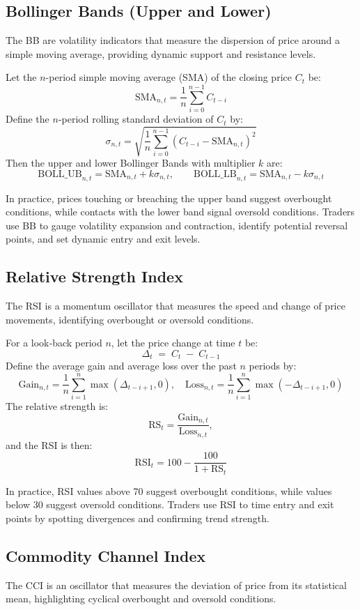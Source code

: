 \subsection{Bollinger Bands (Upper and Lower)}
The \gls{BB} are volatility indicators that measure the dispersion of price around a simple moving average, providing dynamic support and resistance levels.

Let the \(n\)-period simple moving average (SMA) of the closing price \(C_t\) be:
\[\mathrm{SMA}_{n,t} = \frac{1}{n} \sum_{i=0}^{n-1} C_{t-i}\]
Define the \(n\)-period rolling standard deviation of \(C_t\) by:
\[\sigma_{n,t} = \sqrt{\frac{1}{n} \sum_{i=0}^{n-1} (C_{t-i} - \mathrm{SMA}_{n,t})^2}\]
Then the upper and lower Bollinger Bands with multiplier \(k\) are:
\[\mathrm{BOLL\_UB}_{n,t} = \mathrm{SMA}_{n,t} + k \sigma_{n,t}, \qquad \mathrm{BOLL\_LB}_{n,t} = \mathrm{SMA}_{n,t} - k \sigma_{n,t}\]

In practice, prices touching or breaching the upper band suggest overbought conditions, while contacts with the lower band signal oversold conditions. Traders use \gls{BB} to gauge volatility expansion and contraction, identify potential reversal points, and set dynamic entry and exit levels.

\subsection{Relative Strength Index}
The \gls{RSI} is a momentum oscillator that measures the speed and change of price movements, identifying overbought or oversold conditions.

For a look‐back period \(n\), let the price change at time \(t\) be:
\[\Delta_t \;=\; C_t \;-\; C_{t-1}\]
Define the average gain and average loss over the past \(n\) periods by:
\[\mathrm{Gain}_{n,t} = \frac{1}{n} \sum_{i=1}^{n} \max(\Delta_{t-i+1},0), \quad \mathrm{Loss}_{n,t} = \frac{1}{n} \sum_{i=1}^{n} \max(-\Delta_{t-i+1},0)\]
The relative strength is:
\[\mathrm{RS}_t = \frac{\mathrm{Gain}_{n,t}}{\mathrm{Loss}_{n,t}},\]
and the RSI is then:
\[\mathrm{RSI}_t = 100 - \frac{100}{1 + \mathrm{RS}_t}\]

In practice, \gls{RSI} values above 70 suggest overbought conditions, while values below 30 suggest oversold conditions. Traders use \gls{RSI} to time entry and exit points by spotting divergences and confirming trend strength.

\subsection{Commodity Channel Index}
The \gls{CCI} is an oscillator that measures the deviation of price from its statistical mean, highlighting cyclical overbought and oversold conditions.


